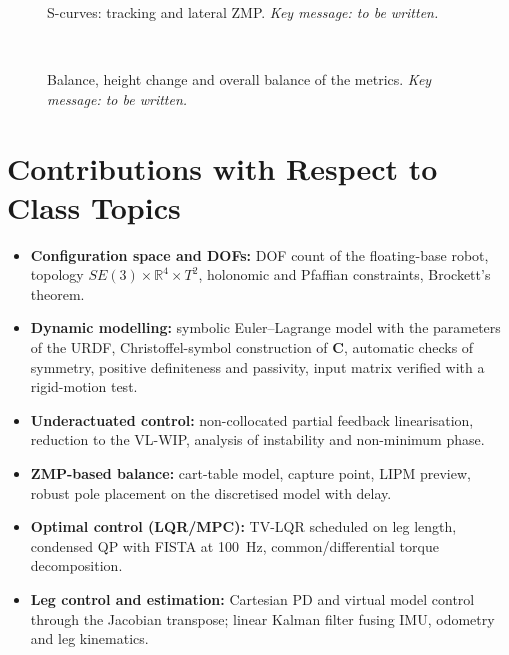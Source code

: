 \documentclass[11pt,a4paper]{article}
\newcommand{\bC}{\bm{C}}
\newcommand{\Real}{\mathbb{R}}
\begin{document}
\begin{figure}[H]
    \centering
    \hfill
    \caption{S-curves: tracking and lateral ZMP.  \emph{Key message: to be written.}}
    \label{fig:cmp_s}
\end{figure}

\begin{figure}[H]
    \centering
    \hfill
    \\[8pt]
    \caption{Balance, height change and overall balance of the metrics.  \emph{Key message: to be
    written.}}
    \label{fig:cmp_bal}
\end{figure}


\section{Contributions with Respect to Class Topics}
\label{sec:contributions}

\begin{itemize}[leftmargin=*]
    \item \textbf{Configuration space and DOFs:} DOF count of the floating-base robot, topology
          $SE(3)\times\Real^4\times T^2$, holonomic and Pfaffian constraints, Brockett's theorem.
    \item \textbf{Dynamic modelling:} symbolic Euler--Lagrange model with the parameters of the
          URDF, Christoffel-symbol construction of $\bC$, automatic checks of symmetry, positive
          definiteness and passivity, input matrix verified with a rigid-motion test.
    \item \textbf{Underactuated control:} non-collocated partial feedback linearisation,
          reduction to the VL-WIP, analysis of instability and non-minimum phase.
    \item \textbf{ZMP-based balance:} cart-table model, capture point, LIPM preview, robust pole
          placement on the discretised model with delay.
    \item \textbf{Optimal control (LQR/MPC):} TV-LQR scheduled on leg length, condensed QP with
          FISTA at 100~Hz, common/differential torque decomposition.
    \item \textbf{Leg control and estimation:} Cartesian PD and virtual model control through the
          Jacobian transpose; linear Kalman filter fusing IMU, odometry and leg kinematics.
\end{itemize}
\end{document}

